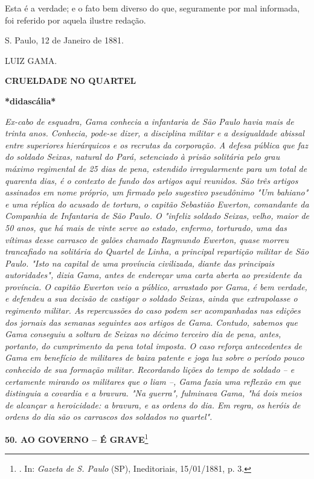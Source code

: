 Esta é a verdade; e o fato bem diverso do que, seguramente por mal
informada, foi referido por aquela ilustre redação.

S. Paulo, 12 de Janeiro de 1881.

LUIZ GAMA.

\textbf{CRUELDADE NO
QUARTEL}

\textbf{*didascália*}

\emph{Ex-cabo de esquadra, Gama conhecia a infantaria de São Paulo havia
mais de trinta anos. Conhecia, pode-se dizer, a disciplina militar e a
desigualdade abissal entre superiores hierárquicos e os recrutas da
corporação. A defesa pública que faz do soldado Seixas, natural do Pará,
setenciado à prisão solitária pelo grau máximo regimental de 25 dias de
pena, estendido irregularmente para um total de quarenta dias, é o
contexto de fundo dos artigos aqui reunidos. São três artigos assinados
em nome próprio, um firmado pelo sugestivo pseudônimo "Um bahiano" e uma
réplica do acusado de tortura, o capitão Sebastião Ewerton, comandante
da Companhia de Infantaria de São Paulo. O "infeliz soldado Seixas,
velho, maior de 50 anos, que há mais de vinte serve ao estado, enfermo,
torturado, uma das vítimas desse carrasco de galões chamado Raymundo
Ewerton, quase morreu trancafiado na solitária do Quartel de Linha, a
principal repartição militar de São Paulo. "Isto na capital de uma
província civilizada, diante das principais autoridades", dizia Gama,
antes de endereçar uma carta aberta ao presidente da província. O
capitão Ewerton veio a público, arrastado por Gama, é bem verdade, e
defendeu a sua decisão de castigar o soldado Seixas, ainda que
extrapolasse o regimento militar. As repercussões do caso podem ser
acompanhadas nas edições dos jornais das semanas seguintes aos artigos
de Gama. Contudo, sabemos que Gama conseguiu a soltura de Seixas no
décimo terceiro dia de pena, antes, portanto, do cumprimento da pena
total imposta. O caso reforça antecedentes de Gama em benefício de
militares de baixa patente e joga luz sobre o período pouco conhecido de
sua formação militar. Recordando lições do tempo de soldado -- e
certamente mirando os militares que o liam --, Gama fazia uma reflexão
em que distinguia a covardia e a bravura. "Na guerra", fulminava Gama,
"há dois meios de alcançar a heroicidade: a bravura, e as ordens do dia.
Em regra, os heróis de ordens do dia são os carrascos dos soldados no
quartel".}

\textbf{50. AO GOVERNO -- É GRAVE}\footnote{. In: \emph{Gazeta de S.
  Paulo} (SP), Ineditoriais, 15/01/1881, p. 3.}

